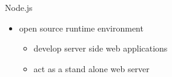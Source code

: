 \begin{frame}{Node.js}
  \begin{itemize}
    \item open source runtime environment
    \begin{itemize}
      \item develop server side web applications
      \item act as a stand alone web server
    \end{itemize}

  \end{itemize}


\end{frame}
